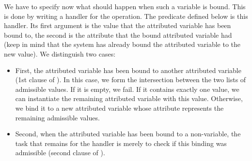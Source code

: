 We have to specify now what should happen when such a variable is
bound. This is done by writing a handler for the  operation.
The predicate  defined below is this
handler.
Its first argument is the value that the attributed variable has been bound to,
the second is the attribute that the bound attributed variable had
(keep in mind that the system has already bound the attributed variable to the
new value).  We distinguish two cases:
\begin{itemize}
\item
First, the attributed variable has been
bound to another attributed variable (1st clause of ).
In this case, we form the intersection between the two lists
of admissible values. If it is empty, we fail.
If it contains exactly one value, we can instantiate the remaining
attributed variable with this value.
Otherwise, we bind it to a new attributed variable whose attribute represents
the remaining admissible values.

\item
Second, when the attributed variable has been bound to a non-variable, the
task that remains for the handler is merely to check if this binding
was admissible (second clause of ).
\end{itemize}

